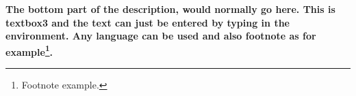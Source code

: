 \begin{commands}[]{}
{\begin{minipage}[t]{0.55\textwidth}
\vspace*{20pt}
\end{minipage}}\hfil%
\par
\leavevmode
\bfseries The bottom part of the description, would normally go here. This is textbox3 and the text can just be entered by typing in the environment. Any language can be used and also footnote as for example\footnote{Footnote example.}.
\egroup
\end{commands}

